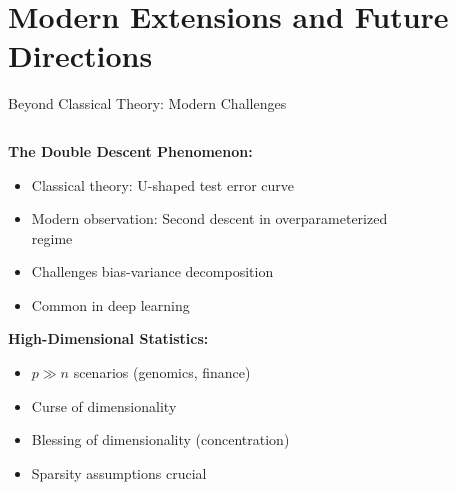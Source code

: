 \documentclass[aspectratio=169,11pt]{beamer}
\begin{document}
\section{Modern Extensions and Future Directions}

\begin{frame}{Beyond Classical Theory: Modern Challenges}
\begin{columns}
\begin{column}{0.5\textwidth}
\textbf{The Double Descent Phenomenon:}
\begin{itemize}
\item Classical theory: U-shaped test error curve
\item Modern observation: Second descent in overparameterized regime
\item Challenges bias-variance decomposition
\item Common in deep learning
\end{itemize}

\vspace{0.3cm}
\textbf{High-Dimensional Statistics:}
\begin{itemize}
\item $p \gg n$ scenarios (genomics, finance)
\item Curse of dimensionality
\item Blessing of dimensionality (concentration)
\item Sparsity assumptions crucial
\end{itemize}
\end{column}
\begin{column}{0.5\textwidth}
\begin{figure}
\centering
{}
\end{figure}


\end{column}
\end{columns}
\end{frame}
\end{document}
